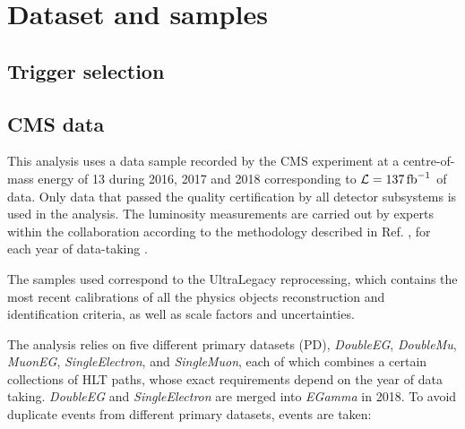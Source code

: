 \section{Dataset and samples}
\label{sec:datasets}

\subsection{Trigger selection}


\subsection{CMS data}
This analysis uses a data sample recorded by the CMS experiment at a centre-of-mass energy of 13 \TeV during 2016, 2017 and 2018 corresponding to $\mathcal{L} = 137 \mbox{\ensuremath{\,\text{fb}^{-1}}}$ of data.
Only data that passed the quality certification by all detector subsystems is used in the analysis.
The luminosity measurements are carried out by experts within the collaboration according to the methodology described in Ref. \cite{CMS:LUM-17-003}, for each year of data-taking \cite{CMS:LUM-17-004, CMS:LUM-18-002}.

The samples used correspond to the UltraLegacy reprocessing, which contains the most recent calibrations of all the physics objects reconstruction and identification criteria, as well as scale factors and uncertainties.

The analysis relies on five different primary datasets (PD),
{\it DoubleEG}, {\it DoubleMu}, {\it MuonEG}, {\it SingleElectron}, and {\it SingleMuon},
each of which combines a certain collections of HLT paths, whose exact requirements depend on the year of data
taking. {\it DoubleEG} and {\it SingleElectron} are merged into {\it EGamma} in 2018.
To avoid duplicate events from different primary datasets, events are taken:


